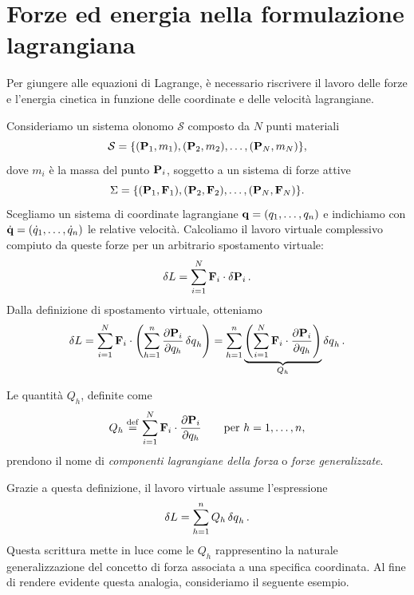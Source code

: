 \section{Forze ed energia nella formulazione lagrangiana}

Per giungere alle equazioni di Lagrange, è necessario riscrivere il lavoro delle forze e l'energia cinetica in funzione delle coordinate e delle velocità lagrangiane. 

Consideriamo un sistema olonomo $\mathcal{S}$ composto da $N$ punti materiali
\begin{equation*}
    \mathcal{S} = \{(\vb{P}_1, m_1), (\vb{P}_2, m_2), \dots, (\vb{P}_N, m_N)\},
\end{equation*}
dove $m_i$ è la massa del punto $\vb{P}_i$, soggetto a un sistema di forze attive
\begin{equation*}
    \Sigma = \{(\vb{P}_1, \vb{F}_1), (\vb{P}_2, \vb{F}_2), \dots, (\vb{P}_N, \vb{F}_N)\}.
\end{equation*}
Scegliamo un sistema di coordinate lagrangiane $\vb{q} = (q_1, \dots, q_n)$ e indichiamo con $\dot{\vb{q}} = (\dot{q}_1, \dots, \dot{q}_n)$ le relative velocità. Calcoliamo il lavoro virtuale complessivo compiuto da queste forze per un arbitrario spostamento virtuale:
\begin{equation*}
    \var{L} = \sum_{i=1}^N \vb{F}_i \cdot \var{\vb{P}}_i.
\end{equation*}
Dalla definizione di spostamento virtuale, otteniamo
\begin{equation*}
    \var{L} = \sum_{i=1}^N \vb{F}_i \cdot \left( \sum_{h=1}^n \pdv{\vb{P}_i}{q_h} \var{q}_h \right) = \sum_{h=1}^n \underbrace{\left( \sum_{i=1}^N \vb{F}_i \cdot \pdv{\vb{P}_i}{q_h} \right)}_{Q_h} \var{q}_h.
\end{equation*}

\begin{definition}
Le quantità $Q_h$, definite come
\begin{equation*}
    Q_h \overset{\mathrm{def}}{=} \sum_{i=1}^N \vb{F}_i \cdot \pdv{\vb{P}_i}{q_h} \qquad \text{per } h=1,\dots,n,
\end{equation*}
prendono il nome di \emph{componenti lagrangiane della forza} o \emph{forze generalizzate}.
\end{definition}

Grazie a questa definizione, il lavoro virtuale assume l'espressione
\begin{equation} \label{eq:lavoroVirtForzeGen}
    \var{L} = \sum_{h=1}^n Q_h \var{q}_h.
\end{equation}
Questa scrittura mette in luce come le $Q_h$ rappresentino la naturale generalizzazione del concetto di forza associata a una specifica coordinata. Al fine di rendere evidente questa analogia, consideriamo il seguente esempio.

